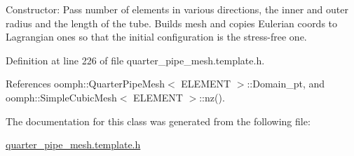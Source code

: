 Constructor\+: Pass number of elements in various directions, the inner and outer radius and the length of the tube. Builds mesh and copies Eulerian coords to Lagrangian ones so that the initial configuration is the stress-\/free one. 



Definition at line 226 of file quarter\+\_\+pipe\+\_\+mesh.\+template.\+h.



References oomph\+::\+Quarter\+Pipe\+Mesh$<$ E\+L\+E\+M\+E\+N\+T $>$\+::\+Domain\+\_\+pt, and oomph\+::\+Simple\+Cubic\+Mesh$<$ E\+L\+E\+M\+E\+N\+T $>$\+::nz().



The documentation for this class was generated from the following file\+:\begin{DoxyCompactItemize}
\item 
\hyperlink{quarter__pipe__mesh_8template_8h}{quarter\+\_\+pipe\+\_\+mesh.\+template.\+h}\end{DoxyCompactItemize}

